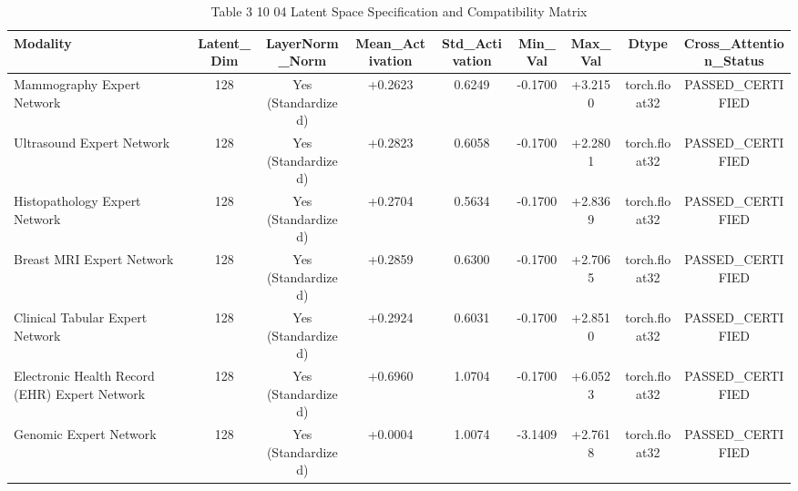 \begin{table}[htbp]
\centering
\small
\begin{tabular}{lcccccccc}
\hline
Modality & Latent\_Dim & LayerNorm\_Norm & Mean\_Activation & Std\_Activation & Min\_Val & Max\_Val & Dtype & Cross\_Attention\_Status \\
\hline
Mammography Expert Network & 128 & Yes (Standardized) & +0.2623 & 0.6249 & -0.1700 & +3.2150 & torch.float32 & PASSED\_CERTIFIED \\
Ultrasound Expert Network & 128 & Yes (Standardized) & +0.2823 & 0.6058 & -0.1700 & +2.2801 & torch.float32 & PASSED\_CERTIFIED \\
Histopathology Expert Network & 128 & Yes (Standardized) & +0.2704 & 0.5634 & -0.1700 & +2.8369 & torch.float32 & PASSED\_CERTIFIED \\
Breast MRI Expert Network & 128 & Yes (Standardized) & +0.2859 & 0.6300 & -0.1700 & +2.7065 & torch.float32 & PASSED\_CERTIFIED \\
Clinical Tabular Expert Network & 128 & Yes (Standardized) & +0.2924 & 0.6031 & -0.1700 & +2.8510 & torch.float32 & PASSED\_CERTIFIED \\
Electronic Health Record (EHR) Expert Network & 128 & Yes (Standardized) & +0.6960 & 1.0704 & -0.1700 & +6.0523 & torch.float32 & PASSED\_CERTIFIED \\
Genomic Expert Network & 128 & Yes (Standardized) & +0.0004 & 1.0074 & -3.1409 & +2.7618 & torch.float32 & PASSED\_CERTIFIED \\
\hline
\end{tabular}
\caption{Table 3 10 04 Latent Space Specification and Compatibility Matrix}
\label{tab:table_3_10_04_latent_space_specification_and_compatibility_matrix}
\end{table}
